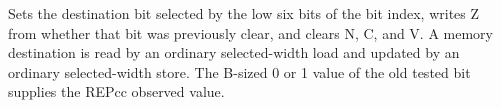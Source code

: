 Sets the destination bit selected by the low six bits of the bit index, writes Z from whether that bit was previously clear, and clears N, C, and V. A memory destination is read by an ordinary selected-width load and updated by an ordinary selected-width store. The B-sized 0 or 1 value of the old tested bit supplies the REPcc observed value.
